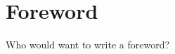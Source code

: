 
\bigskip

\begingroup
\let\clearpage\relax
\let\cleardoublepage\relax
\let\cleardoublepage\relax
\chapter*{Foreword}

Who would want to write a foreword?

\endgroup
